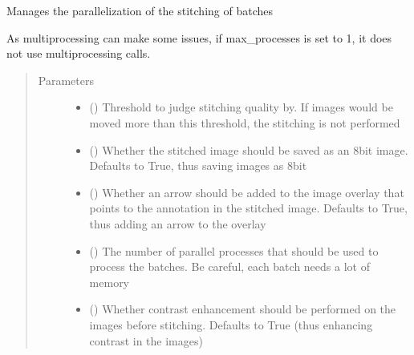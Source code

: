 \documentclass[letterpaper,10pt,english]{sphinxmanual}
\begin{document}
\begin{fulllineitems}
\begin{fulllineitems}
\label{\detokenize{index:stitch_MAPS_annotations.Stitcher.manage_batches}}
Manages the parallelization of the stitching of batches

As multiprocessing can make some issues, if max\_processes is set to 1, it does not use multiprocessing calls.
\begin{quote}\begin{description}
\item[{Parameters}] \leavevmode\begin{itemize}
\item {} 
 () \textendash{} Threshold to judge stitching quality by. If images would be moved more than this
threshold, the stitching is not performed

\item {} 
 () \textendash{} Whether the stitched image should be saved as an 8bit image. Defaults to True, thus saving
images as 8bit

\item {} 
 () \textendash{} Whether an arrow should be added to the image overlay that points to the annotation in
the stitched image. Defaults to True, thus adding an arrow to the overlay

\item {} 
 () \textendash{} The number of parallel processes that should be used to process the batches.
Be careful, each batch needs a lot of memory

\item {} 
 () \textendash{} Whether contrast enhancement should be performed on the images before stitching.
Defaults to True (thus enhancing contrast in the images)

\end{itemize}


\end{description}
\end{quote}
\end{fulllineitems}
\end{fulllineitems}
\end{document}
